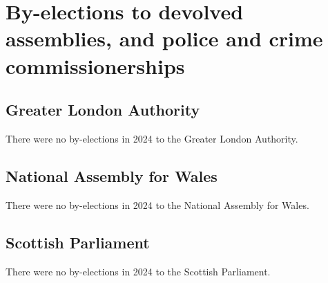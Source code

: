 \documentclass[a4paper,openany]{book}
\begin{document}
\chapter{By-elections to devolved assemblies, and police and crime commissionerships}

\section{Greater London Authority}

There were no by-elections in 2024 to the Greater London Authority.


\section{National Assembly for Wales}

There were no by-elections in 2024 to the National Assembly for Wales.


\section{Scottish Parliament}

There were no by-elections in 2024 to the Scottish Parliament.

%
%
%
\end{document}
